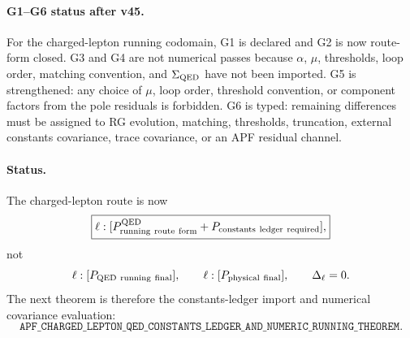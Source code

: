 \paragraph{G1--G6 status after v45.}
For the charged-lepton running codomain, G1 is declared and G2 is now route-form closed.  G3 and G4 are not numerical passes because $\alpha$, $\mu$, thresholds, loop order, matching convention, and $\Sigma_{\rm QED}$ have not been imported.  G5 is strengthened: any choice of $\mu$, loop order, threshold convention, or component factors from the pole residuals is forbidden.  G6 is typed: remaining differences must be assigned to RG evolution, matching, thresholds, truncation, external constants covariance, trace covariance, or an APF residual channel.

\paragraph{Status.}
The charged-lepton route is now
\[
\boxed{
\ell:[P_{\rm running\ route\ form}^{\rm QED}+P_{\rm constants\ ledger\ required}],
}
\]
not
\[
\ell:[P_{\rm QED\ running\ final}],\qquad
\ell:[P_{\rm physical\ final}],\qquad
\Delta_\ell=0.
\]
The next theorem is therefore the constants-ledger import and numerical covariance evaluation:
\[
\boxed{\texttt{APF\_CHARGED\_LEPTON\_QED\_CONSTANTS\_LEDGER\_AND\_NUMERIC\_RUNNING\_THEOREM}.}
\]
